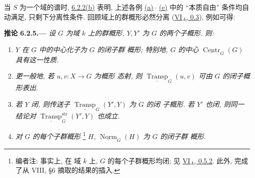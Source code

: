 当 \(S\) 为一个域的谱时,
\hyperref[prop:sga3-VIB-6.2.2]{6.2.2\textup{(b)}} 表明,
上述各例
\hyperref[ex:sga3-VIB-6.2.4-a]{(a)}--%
\hyperref[ex:sga3-VIB-6.2.4-e]{(e)} 中的
``本质自由'' 条件均自动满足, 只剩下分离性条件.
回顾域上的群概形必然分离
(\hyperref[sga3:VIA:0.3]{VI\(_A\), 0.3}), 例如可得:

\medskip
{}\label{cor:sga3-VIB-6.2.5}%
\noindent\textbf{推论 6.2.5.---}
\emph{设 \(G\) 为域 \(k\) 上的群概形,
\(Y,Y'\) 为 \(G\) 的两个子概形. 则:}
\begin{enumerate}
\item[\textup{(i)}]\label{concl:sga3-VIB-6.2.5-i}
  \emph{\(Y\) 在 \(G\) 中的中心化子为 \(G\) 的闭子群
  概形; 特别地, \(G\) 的中心
  \(\underline{\operatorname{Centr}}_G(G)\) 具有这一性质.}
\item[\textup{(i\(^{\prime}\))}]
  \label{concl:sga3-VIB-6.2.5-iprime}
  \emph{更一般地, 若 \(u,v:X\to G\) 为概形
  态射, 则 \(\underline{\operatorname{Transp}}_G(u,v)\)
  可由 \(G\) 的闭子概形表出.}
\item[\textup{(ii)}]\label{concl:sga3-VIB-6.2.5-ii}
  \emph{若 \(Y\) 闭, 则传送子
  \(\underline{\operatorname{Transp}}_G(Y',Y)\) 为 \(G\) 的闭
  子概形. 若 \(Y'\) 也闭, 则同一结论对
  \(\underline{\operatorname{Transp}}^{\mathrm{str}}_G(Y',Y)\)
  也成立.}
\item[\textup{(iii)}]\label{concl:sga3-VIB-6.2.5-iii}
  \emph{对 \(G\) 的每个子群概形}%
  \footnote{\label{note:sga3-VIB-58}编者注: 事实上, 在
  域 \(k\) 上, \(G\) 的每个子群概形均闭; 见
  \hyperref[sga3:VIA:0.5.2]{VI\(_A\), 0.5.2}. 此外, 
  完成了从 VIII, \S6 摘取的结果的插入.}
  \emph{\(H\),
  \(\underline{\operatorname{Norm}}_G(H)\) 为 \(G\) 的闭子群
  概形.}
\end{enumerate}


